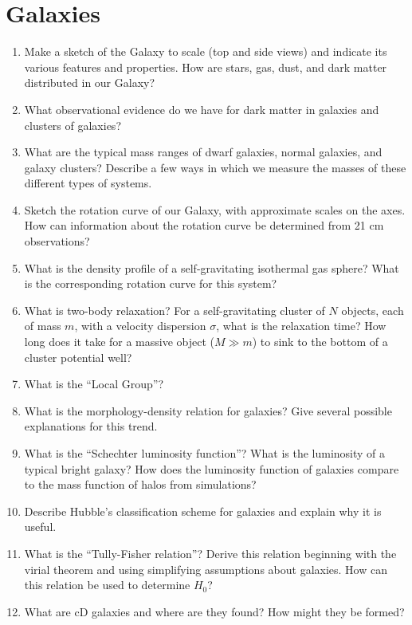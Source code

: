 \documentclass[10pt, oneside]{book}
\begin{document}
\section{Galaxies}

\begin{enumerate}[start=100]
    \item Make a sketch of the Galaxy to scale (top and side views) and indicate its various features and properties. How are stars, gas, dust, and dark matter distributed in our Galaxy?
    \item What observational evidence do we have for dark matter in galaxies and clusters of galaxies?
    \item What are the typical mass ranges of dwarf galaxies, normal galaxies, and galaxy clusters? Describe a few ways in which we measure the masses of these different types of systems.
    \item Sketch the rotation curve of our Galaxy, with approximate scales on the axes. How can information about the rotation curve be determined from 21 cm observations?
    \item What is the density profile of a self-gravitating isothermal gas sphere? What is the corresponding rotation curve for this system?
    \item What is two-body relaxation? For a self-gravitating cluster of $N$ objects, each of mass $m$, with a velocity dispersion $\sigma$, what is the relaxation time? How long does it take for a massive object ($M \gg m$) to sink to the bottom of a cluster potential well?
    \item What is the ``Local Group''?
    \item What is the morphology-density relation for galaxies? Give several possible explanations for this trend.
    \item What is the ``Schechter luminosity function''? What is the luminosity of a typical bright galaxy? How does the luminosity function of galaxies compare to the mass function of halos from simulations?
    \item Describe Hubble's classification scheme for galaxies and explain why it is useful.
    \item What is the ``Tully-Fisher relation''? Derive this relation beginning with the virial theorem and using simplifying assumptions about galaxies. How can this relation be used to determine $H_{0}$?
    \item What are cD galaxies and where are they found? How might they be formed?

\end{enumerate}
\end{document}
